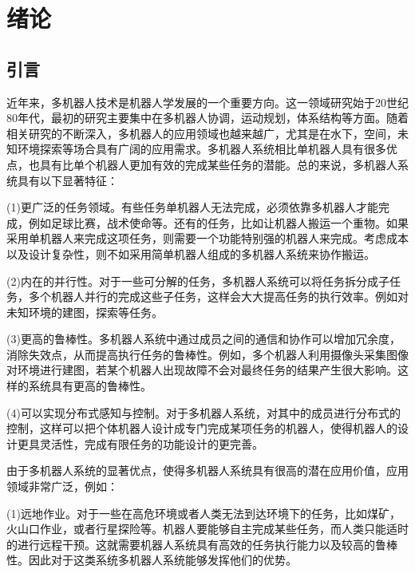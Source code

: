 
\chapter{绪论}
\label{chap:intro}

\section{引言}
近年来，多机器人技术是机器人学发展的一个重要方向。这一领域研究始于20世纪80年代，最初的研究主要集中在多机器人协调，运动规划，体系结构等方面。随着相关研究的不断深入，多机器人的应用领域也越来越广，尤其是在水下，空间，未知环境探索等场合具有广阔的应用需求。多机器人系统相比单机器人具有很多优点，也具有比单个机器人更加有效的完成某些任务的潜能。总的来说，多机器人系统具有以下显著特征\supercite{蔡自兴,谭民2005多机器人系统}：
	
	(1)更广泛的任务领域。有些任务单机器人无法完成，必须依靠多机器人才能完成，例如足球比赛，战术使命等。还有的任务，比如让机器人搬运一个重物。如果采用单机器人来完成这项任务，则需要一个功能特别强的机器人来完成。考虑成本以及设计复杂性，则不如采用简单机器人组成的多机器人系统来协作搬运。
	
	(2)内在的并行性。对于一些可分解的任务，多机器人系统可以将任务拆分成子任务，多个机器人并行的完成这些子任务，这样会大大提高任务的执行效率。例如对未知环境的建图，探索等任务。
	
	(3)更高的鲁棒性。多机器人系统中通过成员之间的通信和协作可以增加冗余度，消除失效点，从而提高执行任务的鲁棒性。例如，多个机器人利用摄像头采集图像对环境进行建图，若某个机器人出现故障不会对最终任务的结果产生很大影响。这样的系统具有更高的鲁棒性。
	
	(4)可以实现分布式感知与控制。对于多机器人系统，对其中的成员进行分布式的控制，这样可以把个体机器人设计成专门完成某项任务的机器人，使得机器人的设计更具灵活性，完成有限任务的功能设计的更完善。
	
由于多机器人系统的显著优点，使得多机器人系统具有很高的潜在应用价值，应用领域非常广泛，例如：

	(1)远地作业。对于一些在高危环境或者人类无法到达环境下的任务，比如煤矿，火山口作业，或者行星探险等。机器人要能够自主完成某些任务，而人类只能适时的进行远程干预。这就需要机器人系统具有高效的任务执行能力以及较高的鲁棒性。因此对于这类系统多机器人系统能够发挥他们的优势。
	
